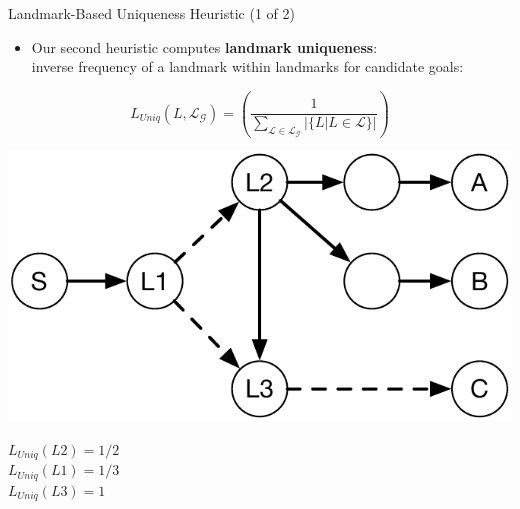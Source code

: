 \documentclass{beamer}
\begin{document}
    \begin{frame}{Landmark-Based Uniqueness Heuristic (1 of 2)}
       	\begin{itemize}
       		\item Our second heuristic computes \textbf{landmark uniqueness}: \\inverse frequency of a landmark within landmarks for candidate goals:%
		\end{itemize}
		
		\begin{equation}
			L_{\mathit{Uniq}}(L, \mathcal{L}_{\mathcal{G}}) = \left(\frac{1}{\displaystyle\sum_{\mathcal{L} \in \mathcal{L_G}} |\{L |L \in \mathcal{L}\}|}\right)
		\end{equation}
		
		\begin{center}
		    \includegraphics[width=.4\textwidth]{example.pdf} 
			\quad
			\begin{minipage}{.4\textwidth}
				\vspace{-6em}
			  $L_{\mathit{Uniq}}(L2)=1/2$ \\
			  $L_{\mathit{Uniq}}(L1)=1/3$ \\
			  $L_{\mathit{Uniq}}(L3)=1$
			\end{minipage}
		\end{center}
    \end{frame}
	
	
\end{document}
